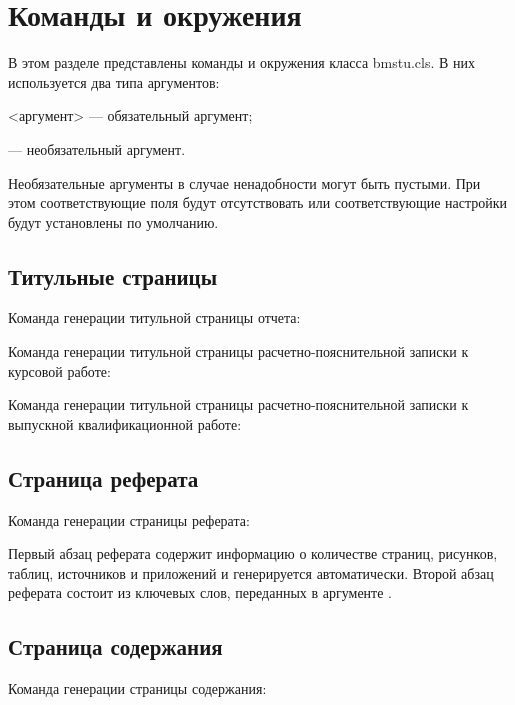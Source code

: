 \documentclass{bmstu}
\begin{document}
\chapter{Команды и окружения}

В этом разделе представлены команды и окружения класса {\ttfamily bmstu.cls}. В них используется два типа аргументов:

{\color{red} \ttfamily <аргумент>} --- обязательный аргумент;

{\color{darkgray} \ttfamily [аргумент]} --- необязательный аргумент.

Необязательные аргументы в случае ненадобности могут быть пустыми. При этом соответствующие поля будут отсутствовать или соответствующие настройки будут установлены по умолчанию.

\section{Титульные страницы}

Команда генерации титульной страницы отчета:

Команда генерации титульной страницы расчетно-пояснительной записки к курсовой работе:

Команда генерации титульной страницы расчетно-пояснительной записки к выпускной квалификационной работе:

\section{Страница реферата}

Команда генерации страницы реферата:

Первый абзац реферата содержит информацию о количестве страниц, рисунков, таблиц, источников и приложений и генерируется автоматически. Второй абзац реферата состоит из ключевых слов, переданных в аргументе {\color{darkgray} }.

\section{Страница содержания}
Команда генерации страницы содержания:
\end{document}
